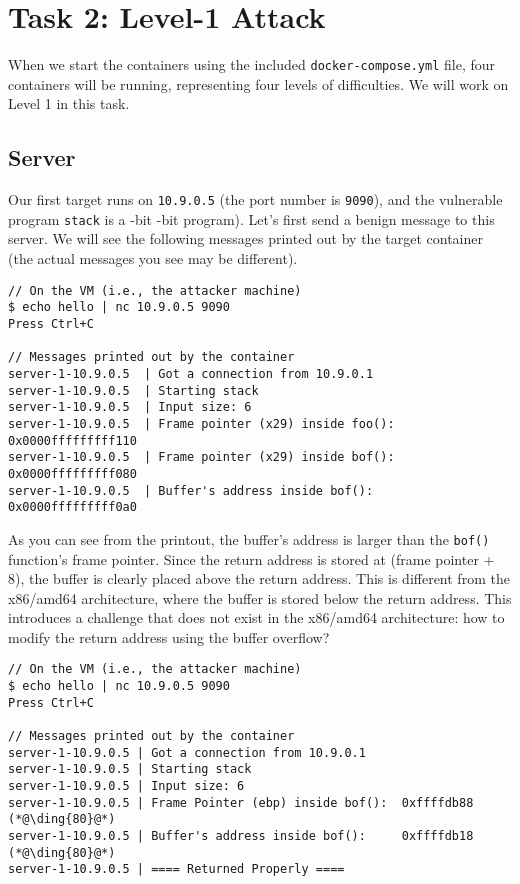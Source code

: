 
\section{Task 2: Level-1 Attack} 


When we start the containers using the included 
\texttt{docker-compose.yml} file, four containers will be 
running, representing four levels of difficulties. 
We will work on Level 1 in this task. 


\subsection{Server} 

Our first target runs on \texttt{10.9.0.5} (the port 
number is \texttt{9090}), 
and the vulnerable program \texttt{stack} is a 
\ifdefined{}-bit
-bit 
\fi
program). Let's first send a benign message to this server.
We will see the following messages printed out by the target container (the
actual messages you see may be different).

\ifdefined\arm
\begin{lstlisting}
// On the VM (i.e., the attacker machine)
$ echo hello | nc 10.9.0.5 9090
Press Ctrl+C

// Messages printed out by the container
server-1-10.9.0.5  | Got a connection from 10.9.0.1
server-1-10.9.0.5  | Starting stack
server-1-10.9.0.5  | Input size: 6
server-1-10.9.0.5  | Frame pointer (x29) inside foo():  0x0000fffffffff110
server-1-10.9.0.5  | Frame pointer (x29) inside bof():  0x0000fffffffff080
server-1-10.9.0.5  | Buffer's address inside bof():     0x0000fffffffff0a0
\end{lstlisting}

As you can see from the printout, the buffer's address is larger than the 
\texttt{bof()} function's frame pointer. Since the return
address is stored at (frame pointer + 8), the buffer is clearly
placed above the return address. This is different from the x86/amd64
architecture, where the buffer is stored below the 
return address. This introduces a challenge that does not exist
in the x86/amd64 architecture: how to modify the
return address using the buffer overflow? 

\else
\begin{lstlisting}
// On the VM (i.e., the attacker machine)
$ echo hello | nc 10.9.0.5 9090
Press Ctrl+C

// Messages printed out by the container
server-1-10.9.0.5 | Got a connection from 10.9.0.1
server-1-10.9.0.5 | Starting stack
server-1-10.9.0.5 | Input size: 6
server-1-10.9.0.5 | Frame Pointer (ebp) inside bof():  0xffffdb88    (*@\ding{80}@*)
server-1-10.9.0.5 | Buffer's address inside bof():     0xffffdb18    (*@\ding{80}@*)
server-1-10.9.0.5 | ==== Returned Properly ====
\end{lstlisting}
\fi


